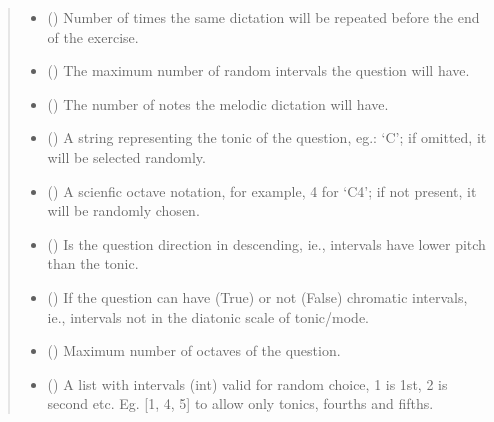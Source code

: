 \documentclass[letterpaper,10pt,english]{sphinxmanual}
\begin{document}
\begin{fulllineitems}
\begin{fulllineitems}
\begin{quote}
\begin{description}
\begin{itemize}
\item {} 
 () \textendash{} Number of times the same dictation will be
repeated before the end of the exercise.

\item {} 
 () \textendash{} The maximum number of random intervals the
question will have.

\item {} 
 () \textendash{} The number of notes the melodic dictation will have.

\item {} 
 () \textendash{} A string representing the tonic of the question,
eg.: ‘C’; if omitted, it will be selected randomly.

\item {} 
 () \textendash{} A scienfic octave notation, for example, 4 for ‘C4’;
if not present, it will be randomly chosen.

\item {} 
 () \textendash{} Is the question direction in descending, ie.,
intervals have lower pitch than the tonic.

\item {} 
 () \textendash{} If the question can have (True) or not (False)
chromatic intervals, ie., intervals not in the diatonic scale
of tonic/mode.

\item {} 
 () \textendash{} Maximum number of octaves of the question.

\item {} 
 () \textendash{} A list with intervals (int) valid for
random choice, 1 is 1st, 2 is second etc. Eg. {[}1, 4, 5{]} to
allow only tonics, fourths and fifths.


\end{itemize}
\end{description}
\end{quote}
\end{fulllineitems}
\end{fulllineitems}
\end{document}
